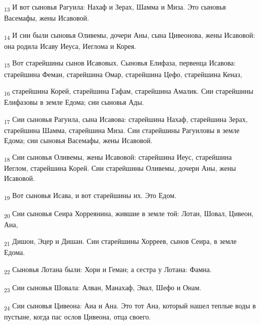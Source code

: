 \begin{tcolorbox}
\textsubscript{13} И вот сыновья Рагуила: Нахаф и Зерах, Шамма и Миза. Это сыновья Васемафы, жены Исавовой.
\end{tcolorbox}
\begin{tcolorbox}
\textsubscript{14} И сии были сыновья Оливемы, дочери Аны, сына Цивеонова, жены Исавовой: она родила Исаву Иеуса, Иеглома и Корея.
\end{tcolorbox}
\begin{tcolorbox}
\textsubscript{15} Вот старейшины сынов Исавовых. Сыновья Елифаза, первенца Исавова: старейшина Феман, старейшина Омар, старейшина Цефо, старейшина Кеназ,
\end{tcolorbox}
\begin{tcolorbox}
\textsubscript{16} старейшина Корей, старейшина Гафам, старейшина Амалик. Сии старейшины Елифазовы в земле Едома; сии сыновья Ады.
\end{tcolorbox}
\begin{tcolorbox}
\textsubscript{17} Сии сыновья Рагуила, сына Исавова: старейшина Нахаф, старейшина Зерах, старейшина Шамма, старейшина Миза. Сии старейшины Рагуиловы в земле Едома; сии сыновья Васемафы, жены Исавовой.
\end{tcolorbox}
\begin{tcolorbox}
\textsubscript{18} Сии сыновья Оливемы, жены Исавовой: старейшина Иеус, старейшина Иеглом, старейшина Корей. Сии старейшины Оливемы, дочери Аны, жены Исавовой.
\end{tcolorbox}
\begin{tcolorbox}
\textsubscript{19} Вот сыновья Исава, и вот старейшины их. Это Едом.
\end{tcolorbox}
\begin{tcolorbox}
\textsubscript{20} Сии сыновья Сеира Хорреянина, жившие в земле той: Лотан, Шовал, Цивеон, Ана,
\end{tcolorbox}
\begin{tcolorbox}
\textsubscript{21} Дишон, Эцер и Дишан. Сии старейшины Хорреев, сынов Сеира, в земле Едома.
\end{tcolorbox}
\begin{tcolorbox}
\textsubscript{22} Сыновья Лотана были: Хори и Геман; а сестра у Лотана: Фамна.
\end{tcolorbox}
\begin{tcolorbox}
\textsubscript{23} Сии сыновья Шовала: Алван, Манахаф, Эвал, Шефо и Онам.
\end{tcolorbox}
\begin{tcolorbox}
\textsubscript{24} Сии сыновья Цивеона: Аиа и Ана. Это тот Ана, который нашел теплые воды в пустыне, когда пас ослов Цивеона, отца своего.
\end{tcolorbox}
